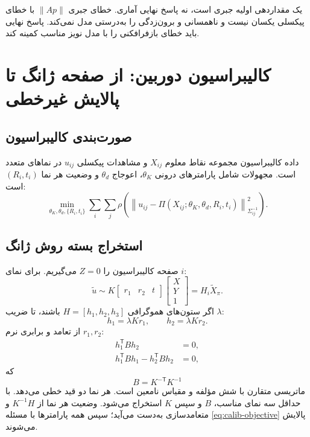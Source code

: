 \documentclass[12pt,openany,oneside]{book}
\newcommand{\norm}[1]{\left\lVert #1\right\rVert}
\newcommand{\trans}{^{\mathsf T}}
\begin{document}
\begin{warningbox}
 یک مقداردهی اولیه جبری است، نه پاسخ نهایی آماری. خطای جبری \(\norm{Ap}\) با خطای پیکسلی یکسان نیست و
ناهمسانی و برون‌زدگی را به‌درستی مدل نمی‌کند. پاسخ نهایی باید خطای بازفرافکنی را با مدل نویز مناسب کمینه کند.
\end{warningbox}

\section{کالیبراسیون دوربین: از صفحه ژانگ تا پالایش غیرخطی}

\subsection{صورت‌بندی کالیبراسیون}
داده کالیبراسیون مجموعه نقاط معلوم \(X_{ij}\) و مشاهدات پیکسلی \(u_{ij}\) در نماهای متعدد است. مجهولات شامل
پارامترهای درونی \(\theta_K\)، اعوجاج \(\theta_d\) و وضعیت هر نما \((R_i,t_i)\) است:
\begin{equation}
\min_{\theta_K,\theta_d,\{R_i,t_i\}}
\sum_i\sum_j
\rho\!\left(
\norm{u_{ij}-\Pi(X_{ij};\theta_K,\theta_d,R_i,t_i)}_{\Sigma_{ij}^{-1}}^2
\right).
\label{eq:calib-objective}
\end{equation}

\subsection{استخراج بسته روش ژانگ}
صفحه کالیبراسیون را \(Z=0\) می‌گیریم. برای نمای \(i\):
\begin{equation}
\widetilde u\sim K\begin{bmatrix}r_1&r_2&t\end{bmatrix}
\begin{bmatrix}X\\Y\\1\end{bmatrix}
=H_i\widetilde X_\pi.
\end{equation}
اگر ستون‌های هموگرافی \(H=[h_1,h_2,h_3]\) باشند، تا ضریب \(\lambda\):
\begin{equation}
h_1=\lambda Kr_1,\qquad h_2=\lambda Kr_2.
\end{equation}
از تعامد و برابری نرم \(r_1,r_2\):
\begin{align}
h_1\trans B h_2&=0,\\
h_1\trans B h_1-h_2\trans B h_2&=0,
\label{eq:zhang-constraints}
\end{align}
که
\begin{equation}
B=K^{-\mathsf T}K^{-1}
\end{equation}
ماتریسی متقارن با شش مؤلفه و مقیاس نامعین است. هر نما دو قید خطی می‌دهد. با حداقل سه نمای مناسب، \(B\) و سپس \(K\)
استخراج می‌شود. وضعیت هر نما از \(K^{-1}H\) و متعامدسازی به‌دست می‌آید؛ سپس همه پارامترها با مسئله
\eqref{eq:calib-objective} پالایش می‌شوند.
\end{document}
